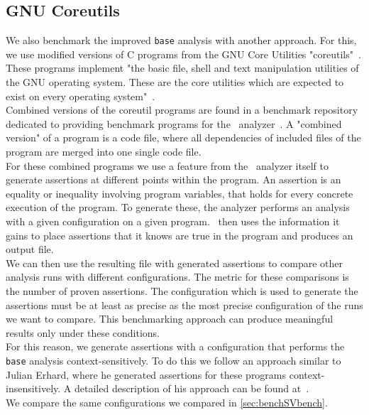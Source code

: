     \subsection{GNU Coreutils}\label{sec:benchCoreutils}
      We also benchmark the improved \texttt{base} analysis with another approach. For this, we use modified versions of C programs from the GNU Core Utilities "coreutils"~\parencite{gnuCoreutils}. These programs implement "the basic file, shell and text manipulation utilities of the GNU operating system. These are the core utilities which are expected to exist on every operating system"~\parencite{gnuCoreutils}.\\
      Combined versions of the coreutil programs are found in a benchmark repository dedicated to providing benchmark programs for the \gob\ analyzer~\parencite{goblintBench}. A "combined version" of a program is a code file, where all dependencies of included files of the program are merged into one single code file.\\
      For these combined programs we use a feature from the \gob\ analyzer itself to generate assertions at different points within the program. An assertion is an equality or inequality involving program variables, that holds for every concrete execution of the program. To generate these, the analyzer performs an analysis with a given configuration on a given program. \gob\ then uses the information it gains to place assertions that it knows are true in the program and produces an output file.\\
      We can then use the resulting file with generated assertions to compare other analysis runs with different configurations. The metric for these comparisons is the number of proven assertions. The configuration which is used to generate the assertions must be at least as precise as the most precise configuration of the runs we want to compare. This benchmarking approach can produce meaningful results only under these conditions.\\
      For this reason, we generate assertions with a configuration that performs the \texttt{base} analysis context-sensitively. To do this we follow an approach similar to Julian Erhard, where he generated assertions for these programs context-insensitively. A detailed description of his approach can be found at~\parencite{svBenchCoreutils}.\\
      We compare the same configurations we compared in \autoref{sec:benchSVbench}.\\
      
